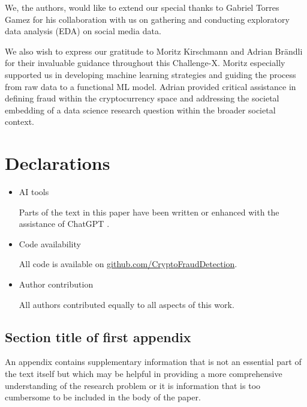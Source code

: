 \documentclass[pdflatex,sn-apa]{sn-jnl}
\begin{document}
We, the authors, would like to extend our special thanks to Gabriel Torres Gamez for his collaboration with us on gathering and conducting exploratory data analysis (EDA) on social media data.

We also wish to express our gratitude to Moritz Kirschmann and Adrian Brändli for their invaluable guidance throughout this Challenge-X. Moritz especially supported us in developing machine learning strategies and guiding the process from raw data to a functional ML model. Adrian provided critical assistance in defining fraud within the cryptocurrency space and addressing the societal embedding of a data science research question within the broader societal context.

\section*{Declarations}

\begin{itemize}
\item AI tools

Parts of the text in this paper have been written or enhanced with the assistance of ChatGPT \citep{OpenAI2024}.

\item Code availability

All code is available on \href{https://github.com/CryptoFraudDetection}{github.com/CryptoFraudDetection}.

\item Author contribution

All authors contributed equally to all aspects of this work.

\end{itemize}

\begin{appendices}

\section{Section title of first appendix}\label{secA1}

An appendix contains supplementary information that is not an essential part of the text itself but which may be helpful in providing a more comprehensive understanding of the research problem or it is information that is too cumbersome to be included in the body of the paper.

\end{appendices}


\end{document}
